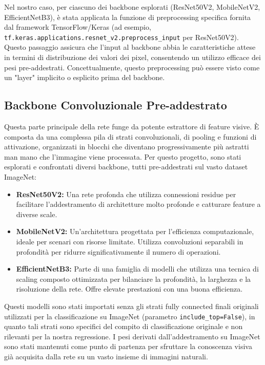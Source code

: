 Nel nostro caso, per ciascuno dei backbone esplorati (ResNet50V2, MobileNetV2, EfficientNetB3), è stata applicata la funzione di preprocessing specifica fornita dal framework TensorFlow/Keras (ad esempio, \texttt{tf.keras.applications.resnet\_v2.preprocess\_input} per ResNet50V2). Questo passaggio assicura che l'input al backbone abbia le caratteristiche attese in termini di distribuzione dei valori dei pixel, consentendo un utilizzo efficace dei pesi pre-addestrati. Concettualmente, questo preprocessing può essere visto come un "layer" implicito o esplicito prima del backbone.

\subsection{Backbone Convoluzionale Pre-addestrato}

Questa parte principale della rete funge da potente estrattore di feature visive. È composta da una complessa pila di strati convoluzionali, di pooling e funzioni di attivazione, organizzati in blocchi che diventano progressivamente più astratti man mano che l'immagine viene processata. Per questo progetto, sono stati esplorati e confrontati diversi backbone, tutti pre-addestrati sul vasto dataset ImageNet:
\begin{itemize}
    \item \textbf{ResNet50V2:} Una rete profonda che utilizza connessioni residue per facilitare l'addestramento di architetture molto profonde e catturare feature a diverse scale.
    \item \textbf{MobileNetV2:} Un'architettura progettata per l'efficienza computazionale, ideale per scenari con risorse limitate. Utilizza convoluzioni separabili in profondità per ridurre significativamente il numero di operazioni.
    \item \textbf{EfficientNetB3:} Parte di una famiglia di modelli che utilizza una tecnica di scaling composto ottimizzata per bilanciare la profondità, la larghezza e la risoluzione della rete. Offre elevate prestazioni con una buona efficienza.
\end{itemize}
Questi modelli sono stati importati senza gli strati fully connected finali originali utilizzati per la classificazione su ImageNet (parametro \texttt{include\_top=False}), in quanto tali strati sono specifici del compito di classificazione originale e non rilevanti per la nostra regressione. I pesi derivati dall'addestramento su ImageNet sono stati mantenuti come punto di partenza per sfruttare la conoscenza visiva già acquisita dalla rete su un vasto insieme di immagini naturali.


